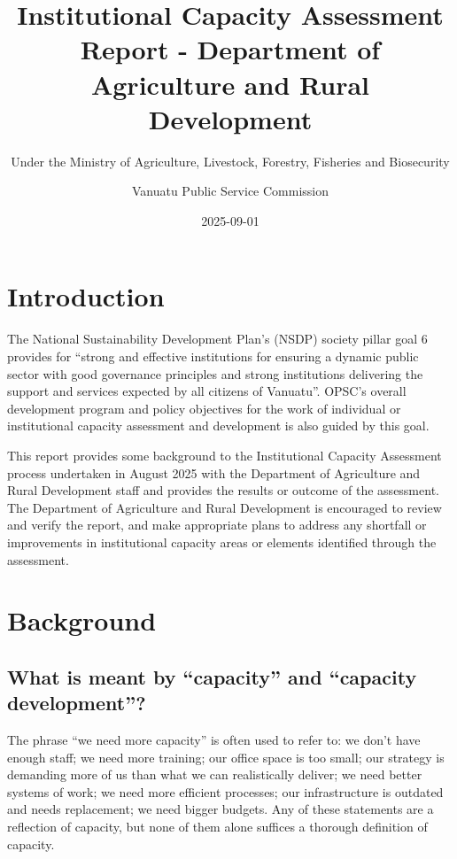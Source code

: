 \documentclass[
  10pt,
]{report}
\title{Institutional Capacity Assessment Report - Department of
Agriculture and Rural Development}
\subtitle{Under the Ministry of Agriculture, Livestock, Forestry,
Fisheries and Biosecurity}
\author{Vanuatu Public Service Commission}
\date{2025-09-01}
\renewcommand*\contentsname{Table of contents}
\newcommand\contentsname{Table of contents}
\begin{document}
\maketitle

\renewcommand*\contentsname{Table of contents}
{
\hypersetup{linkcolor=}
\setcounter{tocdepth}{2}
\tableofcontents
}
\listoffigures
\listoftables


\maketitle

\chapter{Introduction}\label{introduction}

The National Sustainability Development Plan's (NSDP) society pillar
goal 6 provides for ``strong and effective institutions for ensuring a
dynamic public sector with good governance principles and strong
institutions delivering the support and services expected by all
citizens of Vanuatu''. OPSC's overall development program and policy
objectives for the work of individual or institutional capacity
assessment and development is also guided by this goal.

This report provides some background to the Institutional Capacity
Assessment process undertaken in August 2025 with the Department of
Agriculture and Rural Development staff and provides the results or
outcome of the assessment. The Department of Agriculture and Rural
Development is encouraged to review and verify the report, and make
appropriate plans to address any shortfall or improvements in
institutional capacity areas or elements identified through the
assessment.

\chapter{Background}\label{background}

\section{What is meant by ``capacity'' and ``capacity
development''?}\label{what-is-meant-by-capacity-and-capacity-development}

The phrase ``we need more capacity'' is often used to refer to: we don't
have enough staff; we need more training; our office space is too small;
our strategy is demanding more of us than what we can realistically
deliver; we need better systems of work; we need more efficient
processes; our infrastructure is outdated and needs replacement; we need
bigger budgets. Any of these statements are a reflection of capacity,
but none of them alone suffices a thorough definition of capacity.
\end{document}
